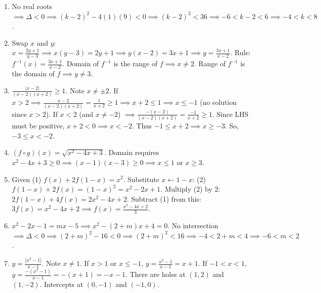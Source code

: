 \documentclass{article}
\begin{document}
\begin{enumerate}
    \item No real roots $\implies \Delta < 0 \implies (k-2)^2 - 4(1)(9) < 0 \implies (k-2)^2 < 36 \implies -6 < k-2 < 6 \implies -4 < k < 8$.
    \vspace{0.5cm}

    \item Swap $x$ and $y$: $x = \frac{2y+1}{y-3} \implies x(y-3) = 2y + 1 \implies y(x-2) = 3x+1 \implies y = \frac{3x+1}{x-2}$.
    Rule: $f^{-1}(x) = \frac{3x+1}{x-2}$.
    Domain of $f^{-1}$ is the range of $f \implies x \neq 2$.
    Range of $f^{-1}$ is the domain of $f \implies y \neq 3$.
    \vspace{0.5cm}

    \item $\frac{|x - 2|}{(x-2)(x+2)} \ge 1$. Note $x \neq \pm 2$.
    If $x > 2 \implies \frac{x-2}{(x-2)(x+2)} = \frac{1}{x+2} \ge 1 \implies x+2 \le 1 \implies x \le -1$ (no solution since $x > 2$).
    If $x < 2$ (and $x \neq -2$) $\implies \frac{-(x-2)}{(x-2)(x+2)} = \frac{-1}{x+2} \ge 1$. Since LHS must be positive, $x+2 < 0 \implies x < -2$. Thus $-1 \le x+2 \implies x \ge -3$.
    So, $-3 \le x < -2$.
    \vspace{0.5cm}

    \item $(f \circ g)(x) = \sqrt{x^2 - 4x + 3}$.
    Domain requires $x^2 - 4x + 3 \ge 0 \implies (x-1)(x-3) \ge 0 \implies x \le 1$ or $x \ge 3$.
    \vspace{0.5cm}

    \item Given (1) $f(x) + 2f(1-x) = x^2$.
    Substitute $x \leftarrow 1-x$: (2) $f(1-x) + 2f(x) = (1-x)^2 = x^2 - 2x + 1$.
    Multiply (2) by 2: $2f(1-x) + 4f(x) = 2x^2 - 4x + 2$.
    Subtract (1) from this: $3f(x) = x^2 - 4x + 2 \implies f(x) = \frac{x^2 - 4x + 2}{3}$.
    \vspace{0.5cm}

    \item $x^2 - 2x - 1 = mx - 5 \implies x^2 - (2+m)x + 4 = 0$.
    No intersection $\implies \Delta < 0 \implies (2+m)^2 - 16 < 0 \implies (2+m)^2 < 16 \implies -4 < 2+m < 4 \implies -6 < m < 2$.
    \vspace{0.5cm}

    \item $y = \frac{|x^2 - 1|}{x - 1}$. Note $x \neq 1$.
    If $x > 1$ or $x \le -1$, $y = \frac{x^2 - 1}{x - 1} = x + 1$.
    If $-1 < x < 1$, $y = \frac{-(x^2 - 1)}{x - 1} = -(x+1) = -x - 1$.
    There are holes at $(1, 2)$ and $(1, -2)$. Intercepts at $(0, -1)$ and $(-1, 0)$.
    \vspace{0.5cm}
\end{enumerate}
\end{document}
